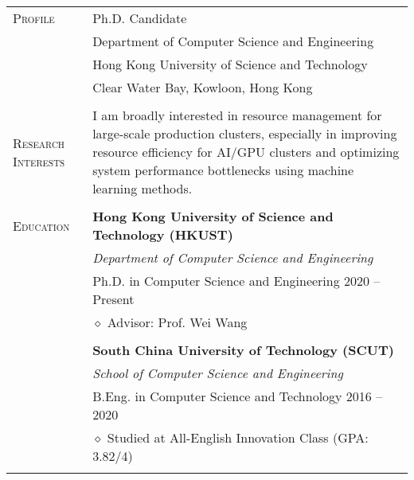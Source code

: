 \documentclass[letterpaper, 11pt]{article}
\begin{document}
\begin{longtable}{p{1in}p{5in}}

{\textsc{Profile}}
& Ph.D. Candidate \\
& Department of Computer Science and Engineering \\
& Hong Kong University of Science and Technology \\
& Clear Water Bay, Kowloon, Hong Kong \\
& \\

\nohyphens{\textsc{Research Interests}}
& I am broadly interested in resource management for large-scale production clusters, especially in improving resource efficiency for AI/GPU clusters and optimizing system performance bottlenecks using machine learning methods. \\
& \\

{\textsc{Education}}
& \textbf{Hong Kong University of Science and Technology (HKUST)} \\
& \textit{Department of Computer Science and Engineering} \\
& Ph.D. in Computer Science and Engineering \hfill 2020 -- Present \\
& $\diamond$ Advisor: Prof. Wei Wang \\
& \\

& \textbf{South China University of Technology (SCUT)} \\
& \textit{School of Computer Science and Engineering} \\
& B.Eng. in Computer Science and Technology \hfill 2016 -- 2020 \\
& $\diamond$ Studied at All-English Innovation Class (GPA: 3.82/4) \\
& \\



\end{longtable}
\end{document}
